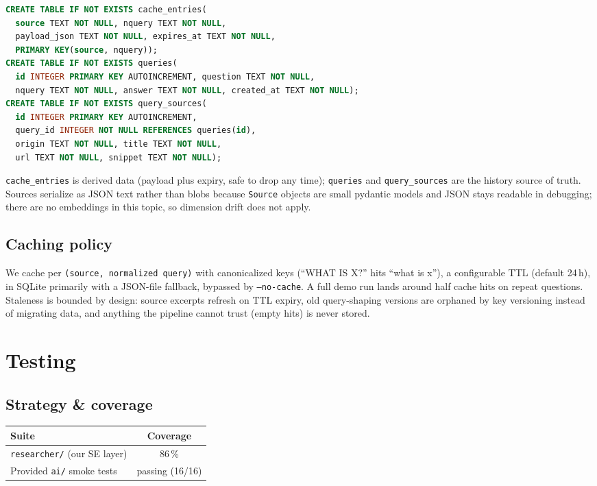 \documentclass[11pt,a4paper]{article}
\begin{document}
\begin{lstlisting}[style=python,language=sql,numbers=none,basicstyle=\ttfamily\small]
CREATE TABLE IF NOT EXISTS cache_entries(
  source TEXT NOT NULL, nquery TEXT NOT NULL,
  payload_json TEXT NOT NULL, expires_at TEXT NOT NULL,
  PRIMARY KEY(source, nquery));
CREATE TABLE IF NOT EXISTS queries(
  id INTEGER PRIMARY KEY AUTOINCREMENT, question TEXT NOT NULL,
  nquery TEXT NOT NULL, answer TEXT NOT NULL, created_at TEXT NOT NULL);
CREATE TABLE IF NOT EXISTS query_sources(
  id INTEGER PRIMARY KEY AUTOINCREMENT,
  query_id INTEGER NOT NULL REFERENCES queries(id),
  origin TEXT NOT NULL, title TEXT NOT NULL,
  url TEXT NOT NULL, snippet TEXT NOT NULL);
\end{lstlisting}

\texttt{cache\_entries} is derived data (payload plus expiry, safe to drop any time); \texttt{queries} and \texttt{query\_sources} are the history source of truth. Sources serialize as JSON text rather than blobs because \texttt{Source} objects are small pydantic models and JSON stays readable in debugging; there are no embeddings in this topic, so dimension drift does not apply.

\subsection{Caching policy}

We cache per \texttt{(source, normalized query)} with canonicalized keys (``WHAT IS X?'' hits ``what is x''), a configurable TTL (default 24\,h), in SQLite primarily with a JSON-file fallback, bypassed by \texttt{--no-cache}. A full demo run lands around half cache hits on repeat questions. Staleness is bounded by design: source excerpts refresh on TTL expiry, old query-shaping versions are orphaned by key versioning instead of migrating data, and anything the pipeline cannot trust (empty hits) is never stored.

\section{Testing}\label{sec:testing}

\subsection{Strategy \& coverage}

\begin{center}\small
\begin{tabular}{lc}
\toprule
\textbf{Suite} & \textbf{Coverage} \\
\midrule
\texttt{researcher/} (our SE layer) & 86\,\% \\
Provided \texttt{ai/} smoke tests & passing (16/16) \\
\bottomrule
\end{tabular}
\end{center}
\end{document}
